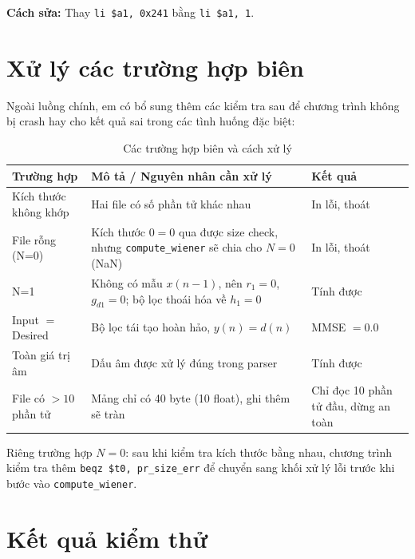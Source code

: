 \documentclass[twoside,final]{hcmut-report}
\begin{document}
\textbf{Cách sửa:} Thay \texttt{li \$a1, 0x241} bằng \texttt{li \$a1, 1}.

\section{Xử lý các trường hợp biên}

Ngoài luồng chính, em có bổ sung thêm các kiểm tra sau để chương
trình không bị crash hay cho kết quả sai trong các tình huống đặc biệt:

\begin{table}[H]
  \centering
  \caption{Các trường hợp biên và cách xử lý}
  \label{tab:edge-cases}
  \begin{tabularx}{\linewidth}{lXl}
    \toprule
    \textbf{Trường hợp} & \textbf{Mô tả / Nguyên nhân cần xử lý} & \textbf{Kết quả} \\
    \midrule
    Kích thước không khớp
      & Hai file có số phần tử khác nhau
      & In lỗi, thoát \\
    File rỗng (N=0)
      & Kích thước $0 = 0$ qua được size check,
        nhưng \texttt{compute\_wiener} sẽ chia cho $N=0$ (NaN)
      & In lỗi, thoát \\
    N=1
      & Không có mẫu $x(n-1)$, nên $r_1 = 0$, $g_{d1} = 0$;
        bộ lọc thoái hóa về $h_1 = 0$
      & Tính được \\
    Input $=$ Desired
      & Bộ lọc tái tạo hoàn hảo, $y(n) = d(n)$
      & MMSE $= 0.0$ \\
    Toàn giá trị âm
      & Dấu âm được xử lý đúng trong parser
      & Tính được \\
    File có $> 10$ phần tử
      & Mảng chỉ có 40 byte (10 float), ghi thêm sẽ tràn
      & Chỉ đọc 10 phần tử đầu, dừng an toàn \\
    \bottomrule
  \end{tabularx}
\end{table}

Riêng trường hợp $N = 0$: sau khi kiểm tra kích thước bằng nhau, chương
trình kiểm tra thêm \texttt{beqz \$t0, pr\_size\_err} để chuyển sang
khối xử lý lỗi trước khi bước vào \texttt{compute\_wiener}.

\section{Kết quả kiểm thử}
\end{document}
